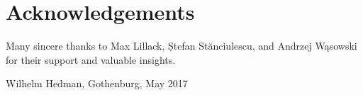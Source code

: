 \thispagestyle{plain}			%
\section*{Acknowledgements}
Many sincere thanks to Max Lillack, Ștefan St\u{a}nciulescu, and Andrzej W\k{a}sowski for their support and valuable insights.


\vspace{1.5cm}
\hfill
Wilhelm Hedman, Gothenburg, May 2017

\newpage				%
\thispagestyle{empty}
\mbox{}